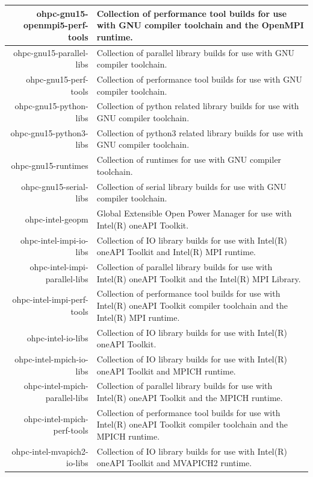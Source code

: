 \begin{tabularx}{\textwidth}{r|X}
\hline
ohpc-gnu15-openmpi5-perf-tools & Collection of performance tool builds for use with GNU compiler toolchain and the OpenMPI runtime. \\
\hline
ohpc-gnu15-parallel-libs & Collection of parallel library builds for use with GNU compiler toolchain. \\
\hline
ohpc-gnu15-perf-tools & Collection of performance tool builds for use with GNU compiler toolchain. \\
\hline
ohpc-gnu15-python-libs & Collection of python related library builds for use with GNU compiler toolchain. \\
\hline
ohpc-gnu15-python3-libs & Collection of python3 related library builds for use with GNU compiler toolchain. \\
\hline
ohpc-gnu15-runtimes & Collection of runtimes for use with GNU compiler toolchain. \\
\hline
ohpc-gnu15-serial-libs & Collection of serial library builds for use with GNU compiler toolchain. \\
\hline
ohpc-intel-geopm & Global Extensible Open Power Manager for use with Intel(R) oneAPI Toolkit. \\
\hline
ohpc-intel-impi-io-libs & Collection of IO library builds for use with Intel(R) oneAPI Toolkit and Intel(R) MPI runtime. \\
\hline
ohpc-intel-impi-parallel-libs & Collection of parallel library builds for use with Intel(R) oneAPI Toolkit and the Intel(R) MPI Library. \\
\hline
ohpc-intel-impi-perf-tools & Collection of performance tool builds for use with Intel(R) oneAPI Toolkit compiler toolchain and the Intel(R) MPI runtime. \\
\hline
ohpc-intel-io-libs & Collection of IO library builds for use with Intel(R) oneAPI Toolkit. \\
\hline
ohpc-intel-mpich-io-libs & Collection of IO library builds for use with Intel(R) oneAPI Toolkit and MPICH runtime. \\
\hline
ohpc-intel-mpich-parallel-libs & Collection of parallel library builds for use with Intel(R) oneAPI Toolkit and the MPICH runtime. \\
\hline
ohpc-intel-mpich-perf-tools & Collection of performance tool builds for use with Intel(R) oneAPI Toolkit compiler toolchain and the MPICH runtime. \\
\hline
ohpc-intel-mvapich2-io-libs & Collection of IO library builds for use with Intel(R) oneAPI Toolkit and MVAPICH2 runtime. \\
\hline
\bottomrule
\end{tabularx}
